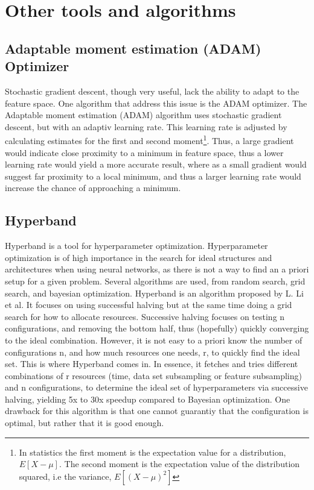 \section{Other tools and algorithms}
\subsection*{Adaptable moment estimation (ADAM) Optimizer}
Stochastic gradient descent, though very useful, lack the ability to adapt to the feature space. One algorithm that address this
issue is the ADAM optimizer\cite{ADAM:opti}. The Adaptable moment estimation (ADAM) algorithm uses stochastic gradient descent, but with 
an adaptiv learning rate. This learning rate is adjusted by calculating estimates for the first and second moment\footnote{In statistics
the first moment is the expectation value for a distribution, $E[X-\mu]$. The second moment is the 
expectation value of the distribution squared, i.e the variance, $E[(X-\mu)^2]$}. Thus, a large gradient would indicate close proximity 
to a minimum in feature space, thus a lower learning rate would yield a more accurate result, 
where as a small gradient would suggest far proximity to a local minimum, and thus a larger learning rate would increase the chance 
of approaching a minimum.\par 

\subsection*{Hyperband}
Hyperband is a tool for hyperparameter optimization\cite{hyperband:opt}. Hyperparameter optimization is of high importance in the 
search for ideal structures and architectures when using neural networks, as there is not a way to find an a priori setup for a 
given problem. Several algorithms are used, from random search, grid search, and bayesian optimization. Hyperband is an algorithm 
proposed by L. Li et al. It focuses on using successful halving\cite{successivehalving}
but at the same time doing a grid search for how to allocate resources. Successive halving focuses on testing n configurations, and removing 
the bottom half, thus (hopefully) quickly converging to the ideal combination. However, it is not easy to a priori know the 
number of configurations n, and how much resources one needs, r, to quickly find the ideal set. This is where Hyperband comes in. 
In essence, it fetches and tries different combinations of r resources (time, data set subsampling or feature subsampling) and n 
configurations, to determine the ideal set of hyperparameters via successive halving, yielding 5x to 30x speedup compared to 
Bayesian optimization. One drawback for this algorithm is that one cannot guarantiy that the configuration is optimal, 
but rather that it is good enough. 


